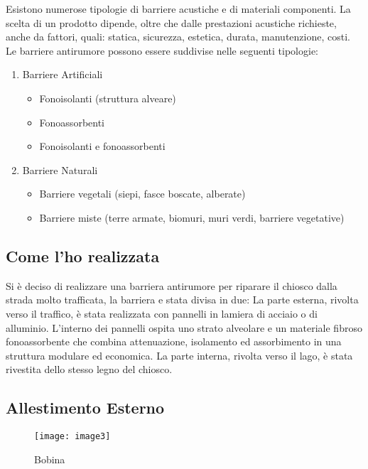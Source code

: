 \noindent
Esistono numerose tipologie di barriere acustiche e di materiali componenti. La scelta di un prodotto dipende, oltre che dalle prestazioni acustiche richieste, anche da fattori, quali: statica, sicurezza, estetica, durata, manutenzione, costi. Le barriere antirumore possono essere suddivise nelle seguenti tipologie: 

\begin{enumerate}
	\item Barriere Artificiali
	\begin{itemize}
		\item Fonoisolanti (struttura alveare)
		\item Fonoassorbenti 
		\item Fonoisolanti e fonoassorbenti
	\end{itemize}
	
	\item Barriere Naturali
	\begin{itemize}
		\item Barriere vegetali (siepi, fasce boscate, alberate) 
		\item Barriere miste (terre armate, biomuri, muri verdi, barriere vegetative)
	\end{itemize}
\end{enumerate}


\subsection{Come l’ho realizzata}

Si è deciso di realizzare una barriera antirumore per riparare il chiosco dalla strada molto trafficata, la barriera e stata divisa in due: La parte esterna, rivolta verso il traffico, è stata realizzata con pannelli in lamiera di acciaio o di alluminio. L'interno dei pannelli ospita uno strato alveolare e un materiale fibroso fonoassorbente che combina attenuazione, isolamento ed assorbimento in una struttura modulare ed economica. La parte interna, rivolta verso il lago, è stata rivestita dello stesso legno del chiosco. 

\subsection{Allestimento Esterno}

\begin{wrapfigure}[9]{r}{0.4\textwidth}
	\centering
	\texttt{[image: image3]}
	\caption{Bobina}
\end{wrapfigure}

